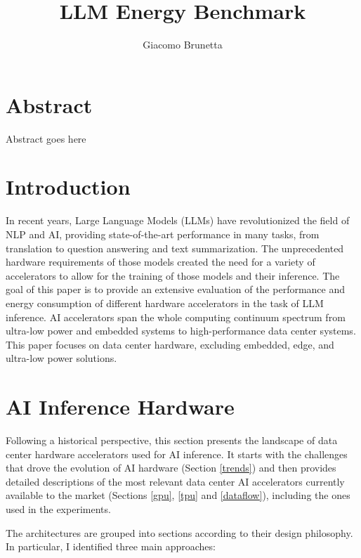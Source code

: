 \documentclass[conference]{IEEEtran}
\title{LLM Energy Benchmark}
\author{Giacomo Brunetta}
\begin{document}
\maketitle
\section{Abstract}

Abstract goes here

\section{Introduction}
In recent years, Large Language Models (LLMs) have revolutionized the field of NLP and AI, providing state-of-the-art performance in many tasks, from translation to question answering and text summarization. The unprecedented hardware requirements of those models created the need for a variety of accelerators to allow for the training of those models and their inference.
The goal of this paper is to provide an extensive evaluation of the performance and energy consumption of different hardware accelerators in the task of LLM inference.
AI accelerators span the whole computing continuum spectrum from ultra-low power and embedded systems to high-performance data center systems\cite{Reuther2020}. This paper focuses on data center hardware, excluding embedded, edge, and ultra-low power solutions.

\section{AI Inference Hardware}
Following a historical perspective, this section presents the landscape of data center hardware accelerators used for AI inference. It starts with the challenges that drove the evolution of AI hardware (Section \ref{trends}) and then provides detailed descriptions of the most relevant data center AI accelerators currently available to the market (Sections \ref{gpu}, \ref{tpu} and \ref{dataflow}), including the ones used in the experiments. 

The architectures are grouped into sections according to their design philosophy. In particular, I identified three main approaches:
\end{document}
